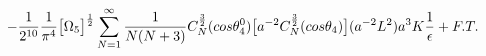 \begin{equation}
-\frac{1}{2^{10}}\frac{1}{\pi^4}\big{[}\Omega_5\big{]}^{\frac{1}{2}}\sum_{N=1}^{\infty}\frac{1}{N(N + 3)}C_N^{\frac{3}{2}}(cos{\theta_4^0})\big{[}a^{-2}C_N^{\frac{3}{2}}(cos{\theta_4})\big{]}
(a^{-2}L^2)a^3K \frac{1}{\epsilon} + F. T.
\end{equation}

